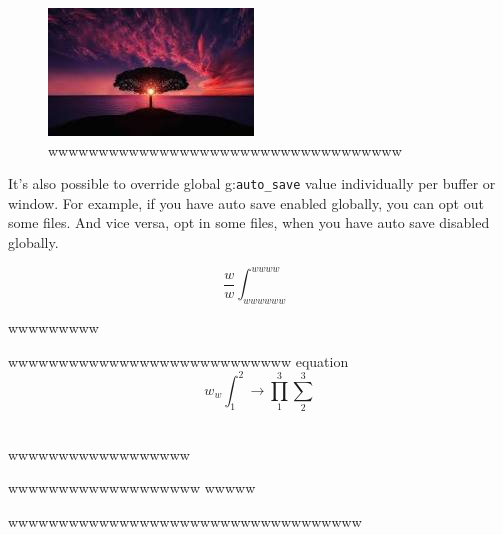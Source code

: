 \documentclass[professionalfont, aspectratio=169]{beamer}
\begin{document}
\begin{frame}
	\begin{figure}
		\begin{center}
			\includegraphics[width=0.3\linewidth]{screenshot002}
		\end{center}
		\caption{wwwwwwwwwwwwwwwwwwwwwwwwwwwwwwwwwww}
		\label{fig:}
	\end{figure}
	It's also possible to override global g:\lstinline{auto_save} value individually per buffer or window. For example, if you have auto save enabled globally, you can opt out some files. And vice versa, opt in some files, when you have auto save disabled globally.


	\begin{equation}
		\frac{w}{w}	\int_{wwwwww}^{wwww}
		\label{www}
	\end{equation}
  
	wwwwwwwww
\end{frame}
\begin{frame}
	wwwwwwwwwwwwwwwwwwwwwwwwwwww
	equation \begin{equation}
		w_w \int_1^2\rightarrow\prod_1^3\sum_2^3
	\end{equation}
	\
\end{frame}

\begin{frame}{wwwwwwwwwwwwwwwwww}
	\begin{block}{wwwwwwwwwwwwwwwwwww}
		wwwww
	\end{block}
	wwwwwwwwwwwwwwwwwwwwwwwwwwwwwwwwwww
\end{frame}
\end{document}
